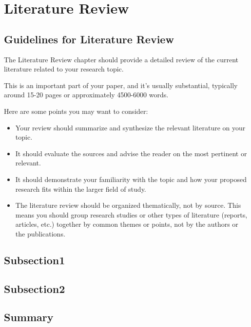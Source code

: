 \chapter{Literature Review}

\section*{Guidelines for Literature Review}
The Literature Review chapter should provide a detailed review of the current literature related to your research topic. 

This is an important part of your paper, and it's usually substantial, typically around 15-20 pages or approximately 4500-6000 words. 

Here are some points you may want to consider:
\begin{itemize}
    \item Your review should summarize and synthesize the relevant literature on your topic.
    \item It should evaluate the sources and advise the reader on the most pertinent or relevant.
    \item It should demonstrate your familiarity with the topic and how your proposed research fits within the larger field of study.
    \item The literature review should be organized thematically, not by source. This means you should group research studies or other types of literature (reports, articles, etc.) together by common themes or points, not by the authors or the publications.
\end{itemize}

\section{Subsection1}

\section{Subsection2}


\section{Summary}

